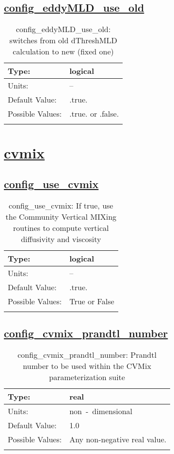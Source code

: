 \subsection[config\_eddyMLD\_use\_old]{\hyperref[sec:nm_tab_eddy_parameterization]{config\_eddyMLD\_use\_old}}
\label{subsec:nm_sec_config_eddyMLD_use_old}
\begin{center}
\begin{longtable}{| p{2.0in} || p{4.0in} |}
    \hline
    Type: & logical \\
    \hline
    Units: & -- \\
    \hline
    Default Value: & .true. \\
    \hline
    Possible Values: & .true. or .false. \\
    \hline
    \caption{config\_eddyMLD\_use\_old: switches from old dThreshMLD calculation to new (fixed one)}
\end{longtable}
\end{center}
\section[cvmix]{\hyperref[sec:nm_tab_cvmix]{cvmix}}
\label{sec:nm_sec_cvmix}
\subsection[config\_use\_cvmix]{\hyperref[sec:nm_tab_cvmix]{config\_use\_cvmix}}
\label{subsec:nm_sec_config_use_cvmix}
\begin{center}
\begin{longtable}{| p{2.0in} || p{4.0in} |}
    \hline
    Type: & logical \\
    \hline
    Units: & -- \\
    \hline
    Default Value: & .true. \\
    \hline
    Possible Values: & True or False \\
    \hline
    \caption{config\_use\_cvmix: If true, use the Community Vertical MIXing routines to compute vertical diffusivity and viscosity}
\end{longtable}
\end{center}
\subsection[config\_cvmix\_prandtl\_number]{\hyperref[sec:nm_tab_cvmix]{config\_cvmix\_prandtl\_number}}
\label{subsec:nm_sec_config_cvmix_prandtl_number}
\begin{center}
\begin{longtable}{| p{2.0in} || p{4.0in} |}
    \hline
    Type: & real \\
    \hline
    Units: & \si{non-dimensional} \\
    \hline
    Default Value: & 1.0 \\
    \hline
    Possible Values: & Any non-negative real value. \\
    \hline
    \caption{config\_cvmix\_prandtl\_number: Prandtl number to be used within the CVMix parameterization suite}
\end{longtable}
\end{center}
